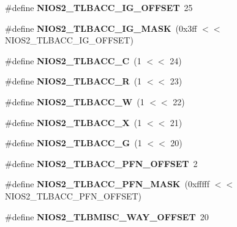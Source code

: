 \begin{DoxyCompactItemize}
\#define {\bfseries N\+I\+O\+S2\+\_\+\+T\+L\+B\+A\+C\+C\+\_\+\+I\+G\+\_\+\+O\+F\+F\+S\+ET}~25
\item 
\mbox{\label{nios2-utility_8h_aff01fdaaf7d6e0239715af2b90b95da6}} 
\#define {\bfseries N\+I\+O\+S2\+\_\+\+T\+L\+B\+A\+C\+C\+\_\+\+I\+G\+\_\+\+M\+A\+SK}~(0x3ff $<$$<$ N\+I\+O\+S2\+\_\+\+T\+L\+B\+A\+C\+C\+\_\+\+I\+G\+\_\+\+O\+F\+F\+S\+E\+T)
\item 
\mbox{\label{nios2-utility_8h_ac3be61795494390833a601e614e6e6ae}} 
\#define {\bfseries N\+I\+O\+S2\+\_\+\+T\+L\+B\+A\+C\+C\+\_\+C}~(1 $<$$<$ 24)
\item 
\mbox{\label{nios2-utility_8h_ac4bc69520aae502f26d6789f4b4f2f82}} 
\#define {\bfseries N\+I\+O\+S2\+\_\+\+T\+L\+B\+A\+C\+C\+\_\+R}~(1 $<$$<$ 23)
\item 
\mbox{\label{nios2-utility_8h_ad076d120e08aa373ff51550bb75d40dd}} 
\#define {\bfseries N\+I\+O\+S2\+\_\+\+T\+L\+B\+A\+C\+C\+\_\+W}~(1 $<$$<$ 22)
\item 
\mbox{\label{nios2-utility_8h_a9b3d443790eca8c4874438f3538d8518}} 
\#define {\bfseries N\+I\+O\+S2\+\_\+\+T\+L\+B\+A\+C\+C\+\_\+X}~(1 $<$$<$ 21)
\item 
\mbox{\label{nios2-utility_8h_a34f67a3dcfb0cbc1d79fd8ea2f166e4f}} 
\#define {\bfseries N\+I\+O\+S2\+\_\+\+T\+L\+B\+A\+C\+C\+\_\+G}~(1 $<$$<$ 20)
\item 
\mbox{\label{nios2-utility_8h_acd55b7650a9924533511e0d7f7565f9b}} 
\#define {\bfseries N\+I\+O\+S2\+\_\+\+T\+L\+B\+A\+C\+C\+\_\+\+P\+F\+N\+\_\+\+O\+F\+F\+S\+ET}~2
\item 
\mbox{\label{nios2-utility_8h_a5827a24c0df6715e5dccc50bf2027a76}} 
\#define {\bfseries N\+I\+O\+S2\+\_\+\+T\+L\+B\+A\+C\+C\+\_\+\+P\+F\+N\+\_\+\+M\+A\+SK}~(0xfffff $<$$<$ N\+I\+O\+S2\+\_\+\+T\+L\+B\+A\+C\+C\+\_\+\+P\+F\+N\+\_\+\+O\+F\+F\+S\+E\+T)
\item 
\mbox{\label{nios2-utility_8h_a167cc34c2d7351b2b20de9f5a9ef3adc}} 
\#define {\bfseries N\+I\+O\+S2\+\_\+\+T\+L\+B\+M\+I\+S\+C\+\_\+\+W\+A\+Y\+\_\+\+O\+F\+F\+S\+ET}~20
$$
\end{DoxyCompactItemize}
